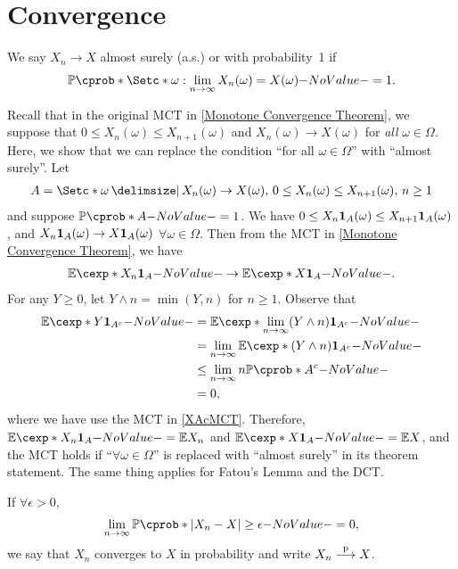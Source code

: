 \documentclass[12pt]{article}
\begin{document}


\section{Convergence}

\begin{Definition}
We say $X_n \to X$ almost surely (a.s.) or with probability~1 if 
\begin{align*}
\P (\set*{\omega: \lim_{n \to \infty} {X_n(\omega)=X(\omega)}})=1.
\end{align*}
\end{Definition}

Recall that in the original MCT in \cref{Monotone Convergence Theorem}, we suppose that $0 \leq X_n(\omega) \leq X_{n+1}(\omega)$ and $X_n(\omega) \to X(\omega)$ for \emph{all} $\omega\in\Omega$. Here, we show that we can replace the condition ``for all $\omega\in\Omega$'' with ``almost surely''. Let 
\begin{align*}
A=\set*{\omega \given X_n(\omega) \to X(\omega),\, 0\leq X_n(\omega )\leq X_{n+1}(\omega ),\, n \geq 1}
\end{align*}
and suppose $\P (A)=1$. We have $0\leq X_n {\bf 1}_{A}(\omega)\leq X_{n+1} {\bf 1}_{A}(\omega)$, and $X_{n} {\bf 1}_{A}(\omega) \to X {\bf 1}_{A}(\omega)$ $\forall \omega \in \Omega$. Then from the MCT in \cref{Monotone Convergence Theorem}, we have
\begin{align*}
\E[X_n \indicatore{A}] \to \E[X \indicatore{A}].
\end{align*}
For any $Y \geq 0$, let $Y \wedge n = \min(Y,n)$ for $n\geq 1$. Observe that
\begin{align}
\E[Y\indicatore{A^c}] 
&= \E[\lim_{n \to \infty} (Y \wedge n) \indicatore{A^c}]\nn
&= \lim_{n \to \infty} \E[(Y \wedge n)\indicatore{A^c}]\label{XAcMCT}\\
& \leq \lim_{n \to \infty} {n \P (A^c)}\nn
&= 0,\nonumber
\end{align}
where we have use the MCT in \cref{XAcMCT}. Therefore, $\E[X_n \indicatore{A}] = \E X_n$ and $\E[X \indicatore{A}] = \E X$, and the MCT holds if ``$\forall \omega\in\Omega$'' is replaced with ``almost surely'' in its theorem statement. The same thing applies for Fatou's Lemma and the DCT.

\begin{Definition}
If $\forall \epsilon >0$,  
\begin{align*}
\lim_ {n \to \infty} \P({|X_n - X| \geq \epsilon})=0, 
\end{align*}
we say that $X_n$ converges to $X$ in probability and write $X_n \stackrel{\mathrm{p}}{\longrightarrow} X$.
\end{Definition}
\end{document}
